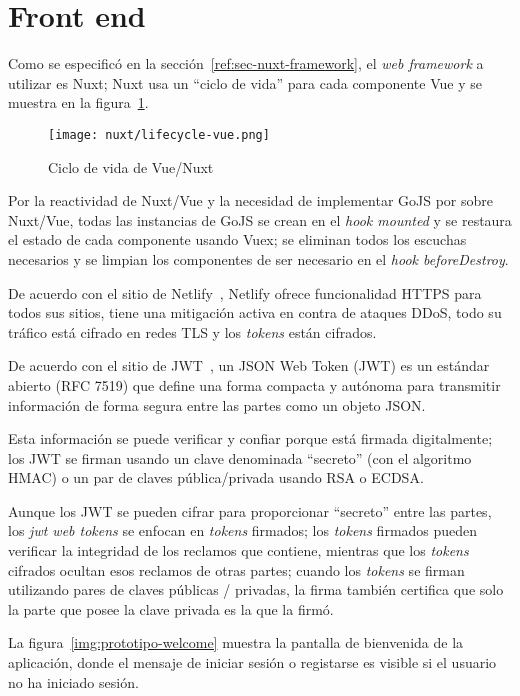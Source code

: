
\section{Front end}


Como se especificó en la sección~\ref{ref:sec-nuxt-framework}, el \textit{web framework} a utilizar es Nuxt; Nuxt usa un  ``ciclo de vida'' para cada componente Vue y se muestra en la figura~\ref{img:nuxt-lifecycle}.

\begin{figure}[H]
    \centering
    \texttt{[image: nuxt/lifecycle-vue.png]}
    \caption{Ciclo de vida de Vue/Nuxt}
    \label{img:nuxt-lifecycle}
  \end{figure}
  
Por la reactividad de Nuxt/Vue y la necesidad de implementar GoJS por sobre Nuxt/Vue, todas las instancias de GoJS se crean en el \textit{hook mounted} y se restaura el estado de cada componente usando Vuex; se eliminan todos los escuchas necesarios y se limpian los componentes de ser necesario en el \textit{hook beforeDestroy}.


De acuerdo con el sitio de Netlify~\cite{netlify_netlify_nodate}, Netlify ofrece funcionalidad HTTPS para todos sus sitios, tiene una mitigación activa en contra de ataques DDoS, todo su tráfico está cifrado en redes TLS y los \textit{tokens} están cifrados.

De acuerdo con el sitio de JWT~\cite{jwt_web_2020}, un JSON Web Token (JWT) es un estándar abierto (RFC 7519) que define una forma compacta y autónoma para transmitir información de forma segura entre las partes como un objeto JSON.


Esta información se puede verificar y confiar porque está firmada digitalmente; los JWT se firman usando un clave denominada ``secreto'' (con el algoritmo HMAC) o un par de claves pública/privada usando RSA o ECDSA.

Aunque los JWT se pueden cifrar para proporcionar ``secreto'' entre las partes, los \textit{jwt web tokens} se enfocan en \textit{tokens} firmados; los \textit{tokens} firmados pueden verificar la integridad de los reclamos que contiene, mientras que los \textit{tokens} cifrados ocultan esos reclamos de otras partes; cuando los \textit{tokens} se firman utilizando pares de claves públicas / privadas, la firma también certifica que solo la parte que posee la clave privada es la que la firmó.


La figura~\ref{img:prototipo-welcome} muestra la pantalla de bienvenida de la aplicación, donde el mensaje de iniciar sesión o registarse es visible si el usuario no ha iniciado sesión.

